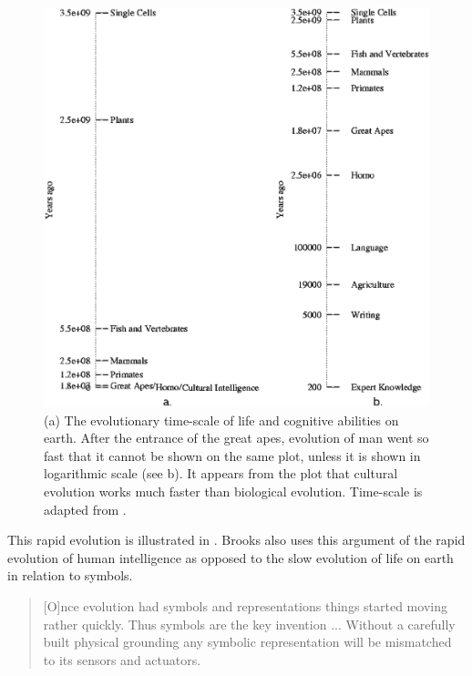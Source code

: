 \begin{figure}
\centerline{\includegraphics[width=12cm]{theory/evol.eps}}
\caption{(a) The evolutionary time-scale of life and cognitive abilities on earth. After the entrance of the great apes, evolution of man went so fast that it cannot be shown on the same plot, unless it is shown in logarithmic scale (see b). It appears from the plot that cultural evolution works much faster than biological evolution. Time-scale is adapted from \citet{brooks:1990}.}
\label{f:theory:evolution}
\end{figure}

This rapid evolution is illustrated in . Brooks also uses this argument of the rapid evolution of human intelligence as opposed to the slow evolution of life on earth in relation to symbols.

\begin{quote}
[O]nce evolution had symbols and representations things started moving rather quickly. Thus symbols are the key invention ... Without a carefully built physical grounding any symbolic representation will be mismatched to its sensors and actuators. \citep{brooks:1990}
\end{quote}


